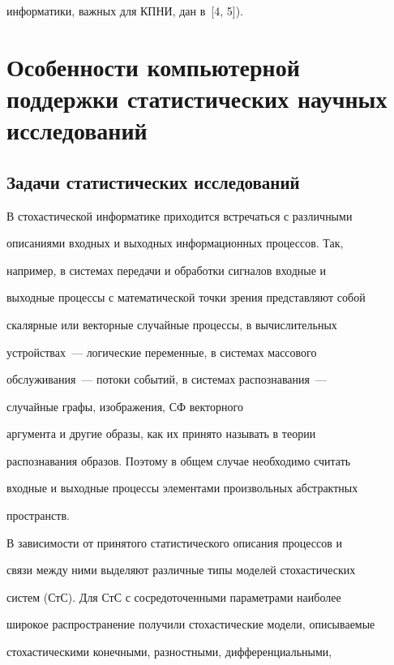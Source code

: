 информатики, важных для КПНИ, дан в~[4, 5]).





\section{Особенности компьютерной поддержки статистических научных исследований}





\subsection{Задачи статистических исследований}





 В стохастической информатике приходится встречаться с различными


описаниями входных и выходных информационных процессов. Так,


например, в системах передачи и обработки сигналов входные и


выходные процессы с математической точки зрения представляют собой


скалярные или векторные случайные процессы, в вычислительных


устройствах~--- логические переменные, в системах массового


обслуживания~--- потоки событий, в системах распознавания~--- 


случайные графы, изображения, СФ векторного


аргумента и другие образы, как их принято называть в  теории


распознавания образов. Поэтому в общем случае необходимо считать


входные и выходные процессы элементами произвольных абстрактных


пространств.





В зависимости от принятого статистического описания процессов и


связи между ними выделяют различные типы моделей стохастических


систем (СтС). Для СтС с сосредоточенными параметрами наиболее


широкое распространение получили стохастические модели, описываемые


стохастическими конечными, разностными, дифференциальными,


